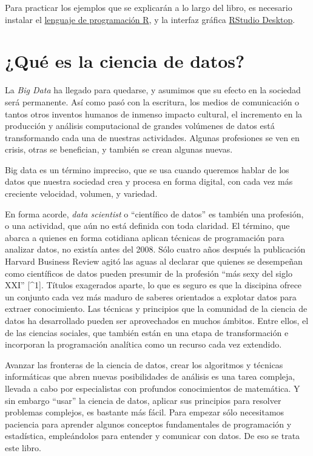 \documentclass[spanish,]{book}
\begin{document}
Para practicar los ejemplos que se explicarán a lo largo del libro, es necesario instalar el \href{https://cloud.r-project.org/}{lenguaje de programación R}, y la interfaz gráfica \href{https://www.rstudio.com/products/rstudio/download/}{RStudio Desktop}.

\hypertarget{quuxe9-es-la-ciencia-de-datos}{%
\chapter{¿Qué es la ciencia de datos?}\label{quuxe9-es-la-ciencia-de-datos}}

La \emph{Big Data} ha llegado para quedarse, y asumimos que su efecto en la sociedad será permanente. Así como pasó con la escritura, los medios de comunicación o tantos otros inventos humanos de inmenso impacto cultural, el incremento en la producción y análisis computacional de grandes volúmenes de datos está transformando cada una de nuestras actividades. Algunas profesiones se ven en crisis, otras se benefician, y también se crean algunas nuevas.

Big data es un término impreciso, que se usa cuando queremos hablar de los datos que nuestra sociedad crea y procesa en forma digital, con cada vez más creciente velocidad, volumen, y variedad.

En forma acorde, \emph{data scientist} o ``científico de datos'' es también una profesión, o una actividad, que aún no está definida con toda claridad. El término, que abarca a quienes en forma cotidiana aplican técnicas de programación para analizar datos, no existía antes del 2008. Sólo cuatro años después la publicación Harvard Business Review agitó las aguas al declarar que quienes se desempeñan como científicos de datos pueden presumir de la profesión ``más sexy del siglo XXI'' {[}\^{}1{]}. Títulos exagerados aparte, lo que es seguro es que la discipina ofrece un conjunto cada vez más maduro de saberes orientados a explotar datos para extraer conocimiento. Las técnicas y principios que la comunidad de la ciencia de datos ha desarrollado pueden ser aprovechados en muchos ámbitos. Entre ellos, el de las ciencias sociales, que también están en una etapa de transformación e incorporan la programación analítica como un recurso cada vez extendido.

Avanzar las fronteras de la ciencia de datos, crear los algoritmos y técnicas informáticas que abren nuevas posibilidades de análisis es una tarea compleja, llevada a cabo por especialistas con profundos conocimientos de matemática. Y sin embargo ``usar'' la ciencia de datos, aplicar sus principios para resolver problemas complejos, es bastante más fácil. Para empezar sólo necesitamos paciencia para aprender algunos conceptos fundamentales de programación y estadística, empleándolos para entender y comunicar con datos. De eso se trata este libro.
\end{document}
